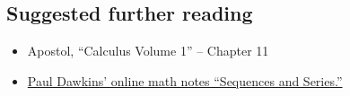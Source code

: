 \subsection*{Suggested further reading}

\begin{itemize}
  \item Apostol, ``Calculus Volume 1'' -- Chapter 11
  \item \href{https://tutorial.math.lamar.edu/Classes/CalcII/SeriesIntro.aspx}{Paul Dawkins' online math notes ``Sequences and Series.''}
\end{itemize}


















